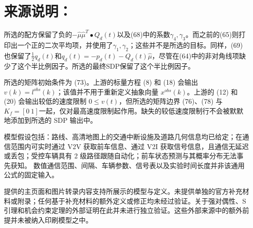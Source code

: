 \documentclass[10pt]{article}
\begin{document}
\section*{来源说明：}
所选的配方保留了负的\(-\hat\mu\hat\mu^T\bullet Q_d(t)\)以及(68)中的系数\(\gamma_4,\gamma_3\)。而之前的(65)则打印出一个正的二次平均项，并使用了\(\gamma_1,\gamma_2\)；这些并不是所选的目标。同样，(69)也保留了\(\tfrac12q_d(t)\)和\(q_d(t)=-p_d(t)-Q_d(t)\hat\mu\)，尽管在(64)中的非对角线项缺少了这个半比例因子。所选的最终SDP保留了这个半比例因子。

所选的矩阵初始条件为 (73)。上游的标量方程 (8) 和 (18) 会输出 \(v(k)=l^{obs}(k)\)；该值并不用于重新定义抽象向量 \(x^{obs}(k)\)。上游的 (12) 和 (20) 会输出较低的速度限制 \(0\leq v(t)\)，但所选的矩阵边界 (76)、(78) 与 \(K_f=[0\ 1]\)一起，仅对最高速度限制起作用。缺失的较低速度限制行不会被默默地添加到所选的 SDP 输出中。

模型假设包括：路线、高清地图上的交通中断设施及道路几何信息均已给定；在通信范围内可实时通过 V2V 获取前车信息、通过 V2I 获取信号信息，且通信无延迟或丢包；受控车辆具有 2 级路径跟随自动化；前车状态预测与其概率分布无法事先获知。 数值通信范围、间隔、车辆参数、信号表以及实验时间长度并非该通用公式的固定输入。

提供的主页面和图片转录内容支持所展示的模型与定义。未提供单独的官方补充材料或附录；任何基于补充材料的额外定义或修正均未经过验证。关于强对偶性、S引理和机会约束定理的外部证明在此并未进行独立验证。这些外部来源中的额外前提并未被纳入印刷模型之中。
\end{document}
